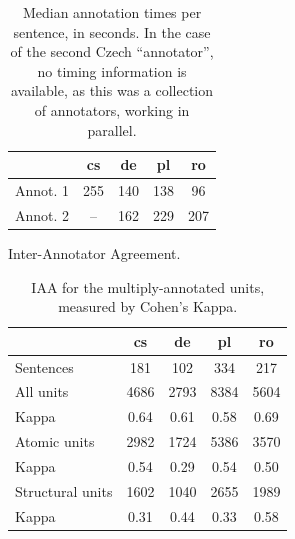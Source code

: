 \documentclass[11pt,letterpaper]{article}
\makeatletter
\renewcommand{\paragraph}{
  \@startsection{paragraph}{4}
  {\z@}{.1ex \@plus .1ex \@minus .1ex}{-1.5em}
  {\normalfont\normalsize\bfseries}
}
\newcommand{\XXX}[1]{{\color{red}XXX #1}} %
\newcommand{\oa}[1]{\footnote{\color{red}OA: #1}}
\makeatother
\begin{document}

\begin{table}[t]
\begin{center}
{\small
\begin{tabular}{l|cccc}
& cs & de & pl & ro \\
\hline
Annot. 1 & 255 & 140  & 138 & 96 \\
Annot. 2 & -- & 162 & 229 & 207 \\
\end{tabular}
\caption{Median annotation times per sentence, in seconds.
  In the case of the second Czech 
  ``annotator'', no timing information is available, as
  this was a collection of annotators, working in parallel.}
\label{tab:annot_times}
}
\end{center}
\end{table}




\paragraph{Inter-Annotator Agreement.}
\label{sec:iaa}

\begin{table}[t]
\begin{center}
{\small
\begin{tabular}{l|cccc}
 & cs & de & pl & ro \\
\hline
Sentences & 181 & 102 & 334 & 217 \\
\hline
All units & 4686   & 2793   & 8384   & 5604  \\
Kappa & 0.64   & 0.61   & 0.58   & 0.69  \\
\hline
Atomic units & 2982 & 1724 & 5386 & 3570 \\
Kappa & 0.54 & 0.29 & 0.54 & 0.50 \\
\hline
Structural units & 1602 & 1040 & 2655 & 1989 \\
Kappa & 0.31 & 0.44 & 0.33 & 0.58 \\
\end{tabular}
\caption{IAA for the multiply-annotated units,
measured by Cohen's Kappa. }
\label{tab:iaa}
}
\end{center}
\end{table}

\end{document}
